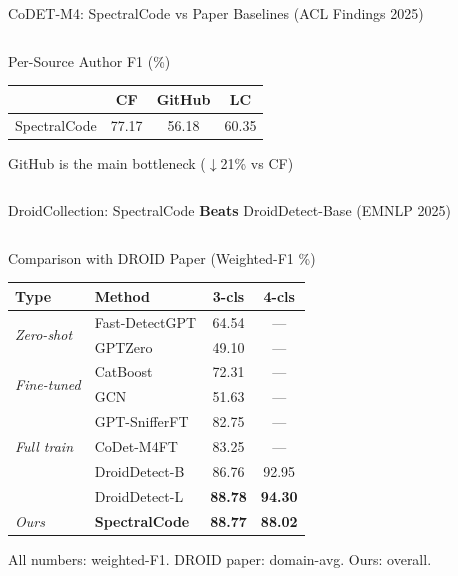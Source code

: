 \documentclass[aspectratio=169, 10pt]{beamer}
\begin{document}
\begin{frame}{CoDET-M4: SpectralCode vs Paper Baselines (ACL Findings 2025)}
\begin{columns}[T]
\begin{block}{Per-Source Author F1 (\%)}
\centering\footnotesize
\begin{tabular}{lccc}
\toprule
& \textbf{CF} & \textbf{GitHub} & \textbf{LC} \\
\midrule
SpectralCode & 77.17 & 56.18 & 60.35 \\
\bottomrule
\end{tabular}
{\tiny \alert{GitHub} is the main bottleneck ($\downarrow$21\% vs CF)}
\end{block}
\end{columns}
\end{frame}


\begin{frame}{DroidCollection: SpectralCode \textbf{Beats} DroidDetect-Base (EMNLP 2025)}
\vspace{-0.2cm}
\begin{columns}[T]
\begin{block}{Comparison with DROID Paper (Weighted-F1 \%)}
\centering\footnotesize
\begin{tabular}{llcc}
\toprule
\textbf{Type} & \textbf{Method} & \textbf{3-cls} & \textbf{4-cls} \\
\midrule
\multirow{2}{*}{\textit{Zero-shot}} & Fast-DetectGPT & 64.54 & --- \\
& GPTZero & 49.10 & --- \\
\midrule
\multirow{2}{*}{\textit{Fine-tuned}} & CatBoost & 72.31 & --- \\
& GCN & 51.63 & --- \\
\midrule
\multirow{3}{*}{\textit{Full train}} & GPT-SnifferFT & 82.75 & --- \\
& CoDet-M4FT & 83.25 & --- \\
& DroidDetect-B & 86.76 & 92.95 \\
& DroidDetect-L & \textbf{88.78} & \textbf{94.30} \\
\midrule
\rowcolor{oursgreen}
\textit{Ours} & \textbf{SpectralCode} & \textbf{88.77} & \textbf{88.02} \\
\bottomrule
\end{tabular}

\vspace{2pt}
{\tiny All numbers: weighted-F1. DROID paper: domain-avg. Ours: overall.}
\end{block}


\end{columns}
\end{frame}
\end{document}
